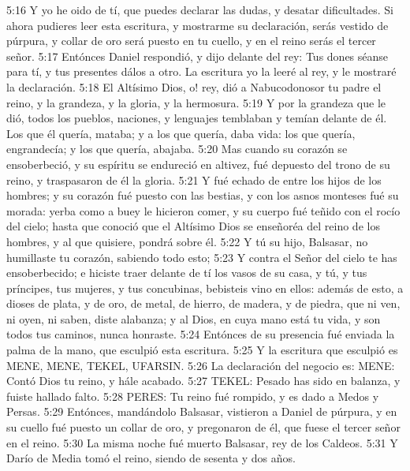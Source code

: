 5:16 Y yo he oido de tí, que puedes declarar las dudas, y desatar dificultades. Si ahora pudieres leer esta escritura, y mostrarme su declaración, serás vestido de púrpura, y collar de oro será puesto en tu cuello, y en el reino serás el tercer señor.
5:17 Entónces Daniel respondió, y dijo delante del rey: Tus dones séanse para tí, y tus presentes dálos a otro. La escritura yo la leeré al rey, y le mostraré la declaración.
5:18 El Altísimo Dios, o! rey, dió a Nabucodonosor tu padre el reino, y la grandeza, y la gloria, y la hermosura.
5:19 Y por la grandeza que le dió, todos los pueblos, naciones, y lenguajes temblaban y temían delante de él. Los que él quería, mataba; y a los que quería, daba vida: los que quería, engrandecía; y los que quería, abajaba.
5:20 Mas cuando su corazón se ensoberbeció, y su espíritu se endureció en altivez, fué depuesto del trono de su reino, y traspasaron de él la gloria.
5:21 Y fué echado de entre los hijos de los hombres; y su corazón fué puesto con las bestias, y con los asnos monteses fué su morada: yerba como a buey le hicieron comer, y su cuerpo fué teñido con el rocío del cielo; hasta que conoció que el Altísimo Dios se enseñoréa del reino de los hombres, y al que quisiere, pondrá sobre él.
5:22 Y tú su hijo, Balsasar, no humillaste tu corazón, sabiendo todo esto;
5:23 Y contra el Señor del cielo te has ensoberbecido; e hiciste traer delante de tí los vasos de su casa, y tú, y tus príncipes, tus mujeres, y tus concubinas, bebisteis vino en ellos: además de esto, a dioses de plata, y de oro, de metal, de hierro, de madera, y de piedra, que ni ven, ni oyen, ni saben, diste alabanza; y al Dios, en cuya mano está tu vida, y son todos tus caminos, nunca honraste.
5:24 Entónces de su presencia fué enviada la palma de la mano, que esculpió esta escritura.
5:25 Y la escritura que esculpió es MENE, MENE, TEKEL, UFARSIN.
5:26 La declaración del negocio es: MENE: Contó Dios tu reino, y hále acabado.
5:27 TEKEL: Pesado has sido en balanza, y fuiste hallado falto.
5:28 PERES: Tu reino fué rompido, y es dado a Medos y Persas.
5:29 Entónces, mandándolo Balsasar, vistieron a Daniel de púrpura, y en su cuello fué puesto un collar de oro, y pregonaron de él, que fuese el tercer señor en el reino.
5:30 La misma noche fué muerto Balsasar, rey de los Caldeos.
5:31 Y Darío de Media tomó el reino, siendo de sesenta y dos años.


